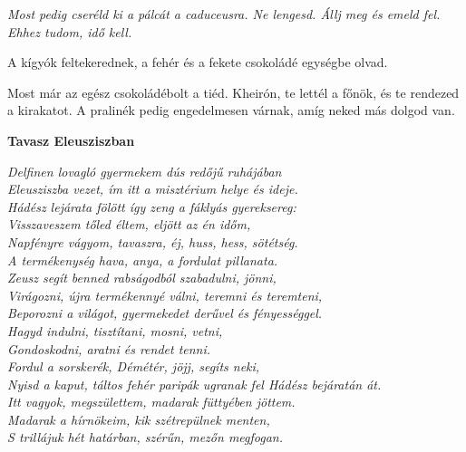 \noindent
\parbox{\wd\illustrationImage}{\usebox{\illustrationImage}}\hfill
\begin{minipage}{\textwidth-\wd\illustrationImage-\columnsep}
\setlength{\parindent}{\origparindent}
\itshape
Most pedig cseréld ki a pálcát a caduceusra.
Ne lengesd. Állj meg és emeld fel. Ehhez
tudom, idő kell.

A kígyók feltekerednek, a fehér és a fekete
csokoládé egységbe olvad.

Most már az egész csokoládébolt a tiéd.
Kheirón, te lettél a főnök, és te rendezed a
kirakatot. A pralinék pedig engedelmesen
várnak, amíg neked más dolgod van.
\end{minipage}

\bigskip
\begin{Verse}
\textbf{Tavasz Eleusziszban}

\bigskip\itshape
Delfinen lovagló gyermekem dús redőjű ruhájában				\\
Eleusziszba vezet, ím itt a misztérium helye és ideje.			\\
Hádész lejárata fölött így zeng a fáklyás gyereksereg:			\\
Visszaveszem tőled éltem, eljött az én időm,				\\
Napfényre vágyom, tavaszra, éj, huss, hess, sötétség.			\\
A termékenység hava, anya, a fordulat pillanata.			\\
Zeusz segít benned rabságodból szabadulni, jönni,			\\
Virágozni, újra termékennyé válni, teremni és teremteni,		\\
Beporozni a világot, gyermekedet derűvel és fényességgel.		\\
Hagyd indulni, tisztítani, mosni, vetni,				\\
Gondoskodni, aratni és rendet tenni.					\\
Fordul a sorskerék, Démétér, jöjj, segíts neki,				\\
Nyisd a kaput, táltos fehér paripák ugranak fel Hádész bejáratán át.	\\
Itt vagyok, megszülettem, madarak füttyében jöttem.			\\
Madarak a hírnökeim, kik szétrepülnek menten,				\\
S trillájuk hét határban, szérűn, mezőn megfogan.
\end{Verse}

